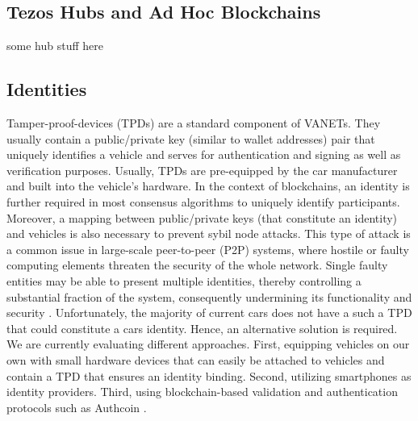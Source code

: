 \documentclass{llncs}
\begin{document}
{		%
		
		\subsection{Tezos Hubs and Ad Hoc Blockchains}
			\label{ss:blockchain-hubs}
			
			
			some hub stuff here
		


		\subsection{Identities}
			\label{ss:identities}
		
			Tamper-proof-devices (TPDs) are a standard component of VANETs. They usually contain a public/private key (similar to wallet addresses) pair that uniquely identifies a vehicle and serves for authentication and signing as well as verification purposes. Usually, TPDs are pre-equipped by the car manufacturer and built into the vehicle's hardware. In the context of blockchains, an identity is further required in most consensus algorithms to uniquely identify participants. Moreover, a mapping between public/private keys (that constitute an identity) and vehicles is also necessary to prevent sybil node attacks. 
			This type of attack is a common issue in large-scale peer-to-peer (P2P) systems, where hostile or faulty computing elements threaten the security of the whole network. Single faulty entities may be able to present multiple identities, thereby controlling a substantial fraction of the system, consequently undermining its functionality and security \cite{douceur2002sybil}.	
			Unfortunately, the majority of current cars does not have a such a TPD that could constitute a cars identity. Hence, an alternative solution is required. We are currently evaluating different approaches. First, equipping vehicles on our own with small hardware devices that can easily be attached to vehicles and contain a TPD that ensures an identity binding. Second, utilizing smartphones as identity providers. Third, using blockchain-based validation and authentication protocols such as Authcoin  \cite{leiding2017securing}\cite{AuthcoinLeiding2016MCIS}\cite{leiding2017mapping}.
		
}
\end{document}
